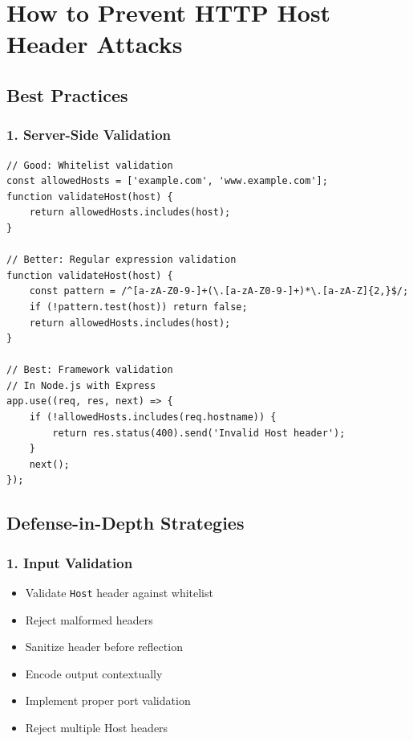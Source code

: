 \documentclass[12pt,a4paper]{article}
\begin{document}
\section{How to Prevent HTTP Host Header Attacks}

\subsection{Best Practices}

\subsubsection{1. Server-Side Validation}

\begin{lstlisting}[caption=Host Validation]
// Good: Whitelist validation
const allowedHosts = ['example.com', 'www.example.com'];
function validateHost(host) {
    return allowedHosts.includes(host);
}

// Better: Regular expression validation
function validateHost(host) {
    const pattern = /^[a-zA-Z0-9-]+(\.[a-zA-Z0-9-]+)*\.[a-zA-Z]{2,}$/;
    if (!pattern.test(host)) return false;
    return allowedHosts.includes(host);
}

// Best: Framework validation
// In Node.js with Express
app.use((req, res, next) => {
    if (!allowedHosts.includes(req.hostname)) {
        return res.status(400).send('Invalid Host header');
    }
    next();
});
\end{lstlisting}



\subsection{Defense-in-Depth Strategies}

\subsubsection{1. Input Validation}
\begin{itemize}
    \item Validate \texttt{Host} header against whitelist
    \item Reject malformed headers
    \item Sanitize header before reflection
    \item Encode output contextually
    \item Implement proper port validation
    \item Reject multiple Host headers
\end{itemize}
\end{document}
